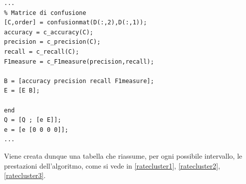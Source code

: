\begin{lstlisting}[style=Matlab-editor,frame=single, caption=Calcolo delle prestazioni, label=rate]  % Start your code-block
...
% Matrice di confusione
[C,order] = confusionmat(D(:,2),D(:,1));
accuracy = c_accuracy(C);
precision = c_precision(C);
recall = c_recall(C);
F1measure = c_F1measure(precision,recall);

B = [accuracy precision recall F1measure];
E = [E B];

end
Q = [Q ; [e E]];
e = [e [0 0 0 0]];
...
\end{lstlisting}
Viene creata dunque una tabella che riassume, per ogni possibile intervallo, le prestazioni dell'algoritmo, come si vede in \ref{ratecluster1}, \ref{ratecluster2}, \ref{ratecluster3}.
\begin{table}[]
	\centering
	\caption{Esempio di tabelle delle prestazioni del clustering}
	\label{ratecluster1}
\end{table}
